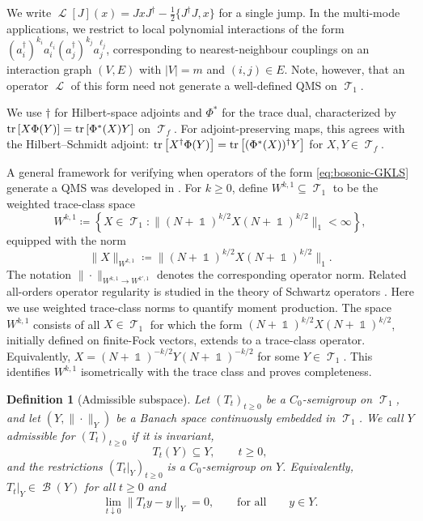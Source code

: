 \documentclass[11pt]{article}
\theoremstyle{myplain}
\theoremstyle{mydefinition}
\newtheorem{defi}[defi]{Definition}
\theoremstyle{remark}
\DeclareMathOperator{\cB}{\mathcal{B}}
\DeclareMathOperator{\cL}{\mathcal{L}}
\DeclareMathOperator{\cT}{\mathcal{T}}
\DeclareMathOperator{\1}{\mathds{1}}
\newcommand{\tr}[1][]{\operatorname{tr}%
  \ifx#1\empty \else \left[ #1 \right] \fi}
\begin{document}
    We write $\cL[J](x) = JxJ^\dagger - \tfrac12\{J^\dagger J,x\}$ for a single jump. In the multi-mode applications, we restrict to local polynomial interactions of the form $(a_i^\dagger)^{k_i} a_i^{\ell_i} (a_j^\dagger)^{k_j} a_j^{\ell_j}$, corresponding to nearest-neighbour couplings on an interaction graph $(V,E)$ with $|V| = m$ and $(i,j)\in E$. Note, however, that an operator $\cL$ of this form need not generate a well-defined QMS on $\cT_1$.

    We use $\dagger$ for Hilbert-space adjoints and $\Phi^*$ for the trace dual, characterized by $\tr[X\Phi(Y)] = \tr[\Phi^*(X)Y]$ on $\cT_f$. For adjoint-preserving maps, this agrees with the Hilbert--Schmidt adjoint: $\tr[X^\dagger\Phi(Y)] = \tr[(\Phi^*(X))^\dagger Y]$ for $X,Y \in \cT_f$.

    A general framework for verifying when operators of the form \eqref{eq:bosonic-GKLS} generate a QMS was developed in \cite{Gondolf.2024}. For $k\geq0$, define $W^{k,1}\subseteq\cT_1$ to be the weighted trace-class space
    \begin{equation*}
        W^{k,1} \coloneqq \left\{ X \in \cT_1 : \|(N + \1)^{k/2} X (N + \1)^{k/2}\|_1 < \infty \right\},
    \end{equation*}
    equipped with the norm
    \begin{equation}\label{eq:sobolev-norm}
        \|X\|_{W^{k,1}} \coloneqq \|(N + \1)^{k/2} X (N + \1)^{k/2}\|_1.
    \end{equation}
    The notation $\|\cdot\|_{W^{k,1} \to W^{k',1}}$ denotes the corresponding operator norm. Related all-orders operator regularity is studied in the theory of Schwartz operators \cite{Keyl.2016}. Here we use weighted trace-class norms to quantify moment production. The space $W^{k,1}$ consists of all $X\in\cT_1$ for which the form $(N+\1)^{k/2}X(N+\1)^{k/2}$, initially defined on finite-Fock vectors, extends to a trace-class operator. Equivalently, $X=(N+\1)^{-k/2}Y(N+\1)^{-k/2}$ for some $Y\in\cT_1$. This identifies $W^{k,1}$ isometrically with the trace class and proves completeness.
    
    \begin{defi}[Admissible subspace]\label{def:admissible-subspace}
        Let $(T_t)_{t\geq0}$ be a $C_0$-semigroup on $\cT_1$, and let
        $(Y,\|\cdot\|_Y)$ be a Banach space continuously embedded in
        $\cT_1$. We call $Y$ \emph{admissible} for $(T_t)_{t\geq0}$ if
        it is invariant,
        \begin{equation*}
            T_t(Y)\subseteq Y,\qquad t\geq0,
        \end{equation*}
        and the restrictions $(T_t|_Y)_{t\geq0}$ is a $C_0$-semigroup
        on $Y$. Equivalently, $T_t|_Y\in\cB(Y)$ for all $t\geq0$ and
        \begin{equation*}
            \lim_{t\downarrow0}\|T_ty-y\|_Y=0,
            \qquad \text{for all}\qquad y\in Y.
        \end{equation*}
    \end{defi}
\end{document}
